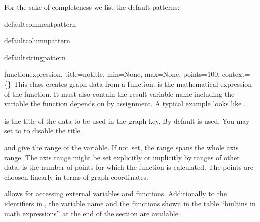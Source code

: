 For the sake of completeness we list the default patterns:

\begin{memberdesc}{defaultcommentpattern}
\end{memberdesc}

\begin{memberdesc}{defaultcolumnpattern}
\end{memberdesc}

\begin{memberdesc}{defaultstringpattern}
\end{memberdesc} %

\begin{classdesc}{function}{expression, title=notitle, %
                            min=None, max=None, points=100,
                            context=\{\}}
  This class creates graph data from a function.  is
  the mathematical expression of the function. It must also contain
  the result variable name including the variable the function depends
  on by assignment. A typical example looks like .

   is the title of the data to be used in the graph key. By
  default  is used. You may set  to
   to disable the title.

   and  give the range of the variable. If not set,
  the range spans the whole axis range. The axis range might be set
  explicitly or implicitly by ranges of other data.  is
  the number of points for which the function is calculated. The
  points are choosen linearly in terms of graph coordinates.

   allows for accessing external variables and functions.
  Additionally to the identifiers in , the variable name
  and the functions shown in the table ``builtins in math
  expressions'' at the end of the section are available.
\end{classdesc} %

